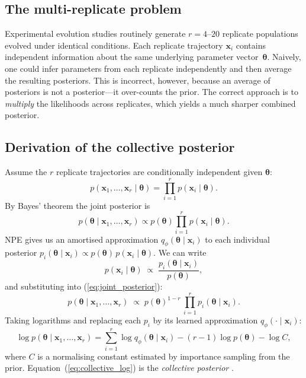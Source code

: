 \documentclass[11pt]{article}
\newcommand{\btheta}{\boldsymbol{\theta}}
\newcommand{\bx}{\mathbf{x}}
\begin{document}
\subsection{The multi-replicate problem}
\label{sec:multi_rep_problem}

Experimental evolution studies routinely generate $r = 4$--$20$ replicate
populations evolved under identical conditions.
Each replicate trajectory $\bx_i$ contains independent information about the
same underlying parameter vector~$\btheta$.
Naively, one could infer parameters from each replicate independently and
then average the resulting posteriors.
This is incorrect, however, because an average of posteriors is not a
posterior---it over-counts the prior.
The correct approach is to \emph{multiply} the likelihoods across replicates,
which yields a much sharper combined posterior.

\subsection{Derivation of the collective posterior}
\label{sec:collective_derivation}

Assume the $r$ replicate trajectories are conditionally independent given
$\btheta$:
\begin{equation}
  p(\bx_1,\ldots,\bx_r\mid\btheta) = \prod_{i=1}^{r} p(\bx_i\mid\btheta).
  \label{eq:likelihood_product}
\end{equation}
By Bayes' theorem the joint posterior is
\begin{equation}
  p(\btheta\mid\bx_1,\ldots,\bx_r)
  \propto p(\btheta)\prod_{i=1}^{r} p(\bx_i\mid\btheta).
  \label{eq:joint_posterior}
\end{equation}
NPE gives us an amortised approximation $q_\phi(\btheta\mid\bx_i)$ to each
individual posterior
$p_i(\btheta\mid\bx_i) \propto p(\btheta)\,p(\bx_i\mid\btheta)$.
We can write
\begin{equation}
  p(\bx_i\mid\btheta) \;\propto\;
  \frac{p_i(\btheta\mid\bx_i)}{p(\btheta)},
  \label{eq:likelihood_from_posterior}
\end{equation}
and substituting into (\ref{eq:joint_posterior}):
\begin{equation}
  p(\btheta\mid\bx_1,\ldots,\bx_r)
  \;\propto\; p(\btheta)^{1-r}\,\prod_{i=1}^{r} p_i(\btheta\mid\bx_i).
  \label{eq:collective_unnorm}
\end{equation}
Taking logarithms and replacing each $p_i$ by its learned approximation
$q_\phi(\cdot\mid\bx_i)$:
\begin{equation}
  \boxed{
  \log p(\btheta\mid\bx_1,\ldots,\bx_r)
  = \sum_{i=1}^{r} \log q_\phi(\btheta\mid\bx_i)
    - (r-1)\log p(\btheta) - \log C,
  }
  \label{eq:collective_log}
\end{equation}
where $C$ is a normalising constant estimated by importance sampling from the
prior.
Equation~(\ref{eq:collective_log}) is the \emph{collective posterior}
\citep{bennun2026collective}.
\end{document}
